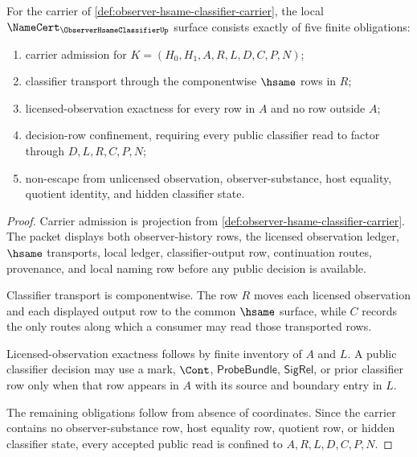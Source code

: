 \begin{theorem}
\label{thm:observer-hsame-classifier-namecert-obligations}
For the carrier of \autoref{def:observer-hsame-classifier-carrier}, the local $\NameCert_{\ObserverHsameClassifierUp}$ surface consists exactly of five finite obligations:
\begin{enumerate}
\item carrier admission for $K=(H_0,H_1,A,R,L,D,C,P,N)$;
\item classifier transport through the componentwise $\hsame$ rows in $R$;
\item licensed-observation exactness for every row in $A$ and no row outside $A$;
\item decision-row confinement, requiring every public classifier read to factor through $D,L,R,C,P,N$;
\item non-escape from unlicensed observation, observer-substance, host equality, quotient identity, and hidden classifier state.
\end{enumerate}
\end{theorem}
\begin{proof}
Carrier admission is projection from \autoref{def:observer-hsame-classifier-carrier}. The packet displays both observer-history rows, the licensed observation ledger, $\hsame$ transports, local ledger, classifier-output row, continuation routes, provenance, and local naming row before any public decision is available.

Classifier transport is componentwise. The row $R$ moves each licensed observation and each displayed output row to the common $\hsame$ surface, while $C$ records the only routes along which a consumer may read those transported rows.

Licensed-observation exactness follows by finite inventory of $A$ and $L$. A public classifier decision may use a mark, $\Cont$, $\mathsf{ProbeBundle}$, $\mathsf{SigRel}$, or prior classifier row only when that row appears in $A$ with its source and boundary entry in $L$.

The remaining obligations follow from absence of coordinates. Since the carrier contains no observer-substance row, host equality row, quotient row, or hidden classifier state, every accepted public read is confined to $A,R,L,D,C,P,N$.
\end{proof}

